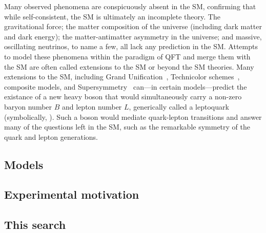 Many observed phenomena are conspicuously absent in the SM, confirming that while self-consistent, the SM is ultimately an incomplete theory. The gravitational force; the matter composition of the universe (including dark matter and dark energy); the matter-antimatter asymmetry in the universe; and massive, oscillating neutrinos, to name a few, all lack any prediction in the SM. Attempts to model these phenomena within the paradigm of QFT and merge them with the SM are often called extensions to the SM or beyond the SM theories. Many extensions to the SM, including Grand Unification~\cite{gut1}\cite{gut2}, Technicolor schemes~\cite{techni1}\cite{techni2}\cite{techni3}, composite models, and Supersymmetry~\cite{superstring} can---in certain models---predict the existance of a new heavy boson that would simultaneously carry a non-zero baryon number $B$ and lepton number $L$, generically called a leptoquark (symbolically, \LQ). Such a boson would mediate quark-lepton transitions and answer many of the questions left in the SM, such as the remarkable symmetry of the quark and lepton generations.

\subsection{Models} \label{sec:LQModels}


\subsection{Experimental motivation} \label{sec:ExperimentalMotivation}


\subsection{This search} \label{sec:ThisSearch}

